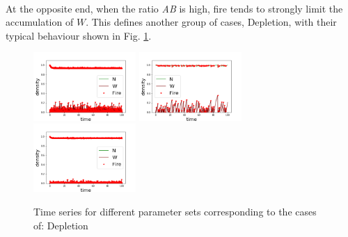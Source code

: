 \documentclass{article}
\begin{document}
\paragraph{}
At the opposite end, when the ratio \textit{AB} is high, fire tends to strongly limit the accumulation of $W$. This defines another group of cases, Depletion, with their typical behaviour shown in Fig. \ref{fig:casesdep}.
\begin{figure}[h!]
\centering
\includegraphics[width=3.9cm]{continue_1.png}
\includegraphics[width=3.9cm]{continue_2.png}
\includegraphics[width=3.9cm]{continue_3.png}
\caption{Time series for different parameter sets corresponding to the cases of: Depletion}
\label{fig:casesdep}
\end{figure}
\end{document}
